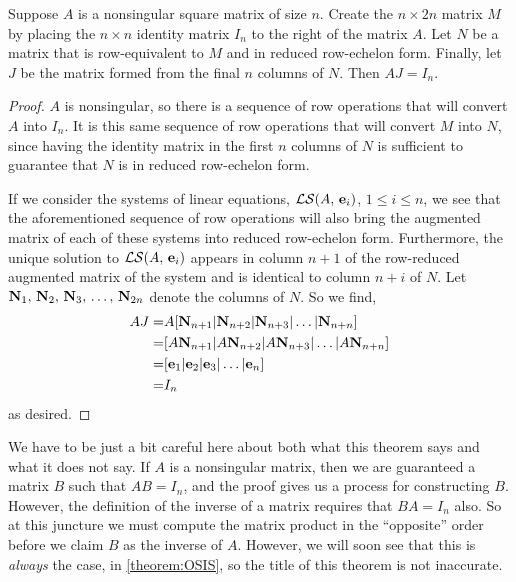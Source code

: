 \documentclass{ximera}
\begin{document}
\begin{theorem}
\label{theorem:CINM}

Suppose $A$ is a nonsingular square matrix of size $n$.  Create the
$n\times 2n$ matrix $M$ by placing the $n\times n$ identity matrix
$I_n$ to the right of the matrix $A$.  Let $N$ be a matrix that is
row-equivalent to $M$ and in reduced row-echelon form.  Finally, let
$J$ be the matrix formed from the final $n$ columns of $N$. Then
$AJ=I_n$.

\begin{proof}
  $A$ is nonsingular, so there is a sequence of row operations that
  will convert $A$ into $I_n$.  It is this same sequence of row
  operations that will convert $M$ into $N$, since having the identity
  matrix in the first $n$ columns of $N$ is sufficient to guarantee
  that $N$ is in reduced row-echelon form.

  If we consider the systems of linear equations,
  $\mathcal{LS}\!\left(A,\,\mathbf{e}_i\right)$, $1\leq i\leq n$, we see that the
  aforementioned sequence of row operations will also bring the
  augmented matrix of each of these systems into reduced row-echelon
  form.  Furthermore, the unique solution to
  $\mathcal{LS}\!\left(A,\,\mathbf{e}_i\right)$ appears in column $n+1$ of the
  row-reduced augmented matrix of the system and is identical to
  column $n+i$ of $N$.  Let $\mathbf{N}_{1},\,\mathbf{N}_{2},\,\mathbf{N}_{3},\,\ldots,\,\mathbf{N}_{2n}$ denote the columns of
  $N$.  So we find,
  \begin{align*}
    AJ=&A[\mathbf{N}_{n+1}|\mathbf{N}_{n+2}|\mathbf{N}_{n+3}|\ldots|\mathbf{N}_{n+n}]\\
    =&[A\mathbf{N}_{n+1}|A\mathbf{N}_{n+2}|A\mathbf{N}_{n+3}|\ldots|A\mathbf{N}_{n+n}]\\
    =&[\mathbf{e}_1|\mathbf{e}_2|\mathbf{e}_3|\ldots|\mathbf{e}_n]\\
    =&I_n
  \end{align*}
  as desired.

\end{proof}
\end{theorem}

We have to be just a bit careful here about both what this theorem
says and what it does not say.  If $A$ is a nonsingular matrix, then
we are guaranteed a matrix $B$ such that $AB=I_n$, and the proof gives
us a process for constructing $B$.  However, the definition of the
inverse of a matrix requires that $BA=I_n$ also.  So at this juncture
we must compute the matrix product in the ``opposite'' order before we
claim $B$ as the inverse of $A$.  However, we will soon see that this
is \textit{always} the case, in \ref{theorem:OSIS}, so the title of
this theorem is not inaccurate.
\end{document}
